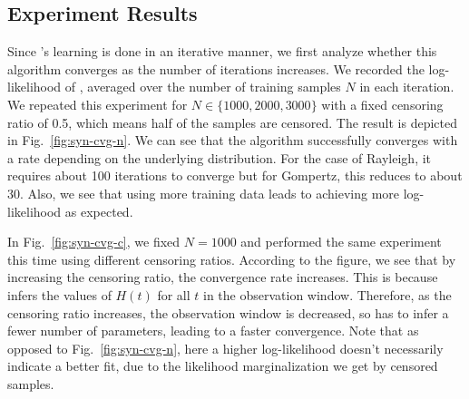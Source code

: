 \subsection{Experiment Results}
Since \npglm's learning is done in an iterative manner, we first analyze whether this algorithm converges as the number of iterations increases. We recorded the log-likelihood of \npglm, averaged over the number of training samples $N$ in each iteration. We repeated this experiment for $N\in\{1000,2000,3000\}$ with a fixed censoring ratio of 0.5, which means half of the samples are censored. The result is depicted in Fig.~\ref{fig:syn-cvg-n}. We can see that the algorithm successfully converges with a rate depending on the underlying distribution. For the case of Rayleigh, it requires about 100 iterations to converge but for Gompertz, this reduces to about 30. Also, we see that using more training data leads to achieving more log-likelihood as expected.



In Fig.~\ref{fig:syn-cvg-c}, we fixed $N=1000$ and performed the same experiment this time using different censoring ratios. According to the figure, we see that by increasing the censoring ratio, the convergence rate increases. This is because \npglm infers the values of $H(t)$ for all $t$ in the observation window. Therefore, as the censoring ratio increases, the observation window is decreased, so \npglm has to infer a fewer number of parameters, leading to a faster convergence. Note that as opposed to Fig.~\ref{fig:syn-cvg-n}, here a higher log-likelihood doesn't necessarily indicate a better fit, due to the likelihood marginalization we get by censored samples.



